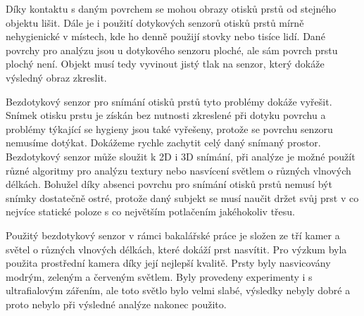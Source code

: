 Díky kontaktu s daným povrchem se mohou obrazy otisků prstů od stejného objektu lišit. Dále je i použití dotykových senzorů otisků prstů mírně nehygienické v místech, kde ho denně použijí stovky nebo tisíce lidí. Dané povrchy pro analýzu jsou u dotykového senzoru ploché, ale sám povrch prstu plochý není. Objekt musí tedy vyvinout jistý tlak na senzor, který dokáže výsledný obraz zkreslit. 

Bezdotykový senzor pro snímání otisků prstů tyto problémy dokáže vyřešit. Snímek otisku prstu je získán bez nutnosti zkreslené při dotyku povrchu a problémy týkající se hygieny jsou také vyřešeny, protože se povrchu senzoru nemusíme dotýkat. Dokážeme rychle zachytit celý daný snímaný prostor. Bezdotykový senzor může sloužit k 2D i 3D snímání, při analýze je možné použít různé algoritmy pro analýzu textury nebo nasvícení světlem o různých vlnových délkách. Bohužel díky absenci povrchu pro snímání otisků prstů nemusí být snímky dostatečně ostré, protože daný subjekt se musí naučit držet svůj prst v co nejvíce statické poloze s co největším potlačením jakéhokoliv třesu. \cite{TouchlessSensorStudy} 

Použitý bezdotykový senzor v rámci bakalářské práce je složen ze tří kamer a světel o různých vlnových délkách, které dokáží prst nasvítit. Pro výzkum byla použita prostřední kamera díky její nejlepší kvalitě. Prsty byly nasvicovány modrým, zeleným a červeným světlem. Byly provedeny experimenty i s ultrafialovým zářením, ale toto světlo bylo velmi slabé, výsledky nebyly dobré a proto nebylo při výsledné analýze nakonec použito.

